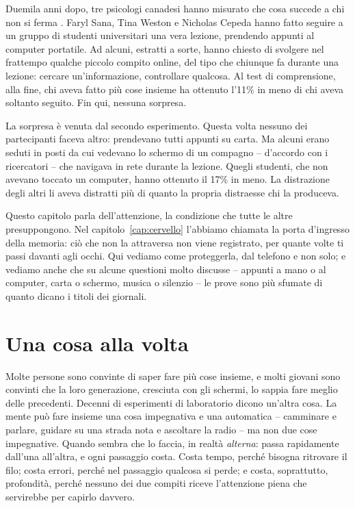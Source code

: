 Duemila anni dopo, tre psicologi canadesi hanno misurato che cosa
succede a chi non si ferma \parencite{sana2013}. Faryl Sana, Tina Weston
e Nicholas Cepeda hanno fatto seguire a un gruppo di studenti
universitari una vera lezione, prendendo appunti al computer
portatile. Ad alcuni, estratti a sorte, hanno
chiesto di svolgere nel frattempo qualche piccolo compito online, del
tipo che chiunque fa durante una lezione: cercare un'informazione,
controllare qualcosa. Al test di comprensione, alla fine, chi aveva
fatto più cose insieme ha ottenuto l'11\% in meno di chi aveva soltanto
seguito. Fin qui, nessuna sorpresa.

La sorpresa è venuta dal secondo esperimento. Questa volta nessuno dei
partecipanti faceva altro: prendevano tutti appunti su carta. Ma alcuni
erano seduti in posti da cui vedevano lo schermo di un compagno --
d'accordo con i ricercatori -- che navigava in rete durante la lezione.
Quegli studenti, che non avevano toccato un computer, hanno ottenuto
il 17\% in meno. La distrazione degli altri li aveva distratti più di
quanto la propria distraesse chi la produceva.

Questo capitolo parla dell'attenzione, la condizione che tutte le altre
presuppongono. Nel capitolo~\ref{cap:cervello} l'abbiamo chiamata la
porta d'ingresso della memoria: ciò che non la attraversa non viene
registrato, per quante volte ti passi davanti agli occhi. Qui vediamo
come proteggerla, dal telefono e non solo; e vediamo anche che su
alcune questioni molto discusse -- appunti a mano o al computer, carta
o schermo, musica o silenzio -- le prove sono più sfumate di quanto
dicano i titoli dei giornali.

\section{Una cosa alla volta}

Molte persone sono convinte di saper fare più cose insieme, e molti
giovani sono convinti che la loro generazione, cresciuta con gli
schermi, lo sappia fare meglio delle precedenti. Decenni di esperimenti
di laboratorio dicono un'altra cosa. La mente può fare insieme una cosa
impegnativa e una automatica -- camminare e parlare, guidare su una
strada nota e ascoltare la radio -- ma non due cose impegnative. Quando
sembra che lo faccia, in realtà \emph{alterna}: passa rapidamente
dall'una all'altra, e ogni passaggio costa. Costa tempo, perché bisogna
ritrovare il filo; costa errori, perché nel passaggio qualcosa si perde;
e costa, soprattutto, profondità, perché nessuno dei due compiti riceve
l'attenzione piena che servirebbe per capirlo davvero.

